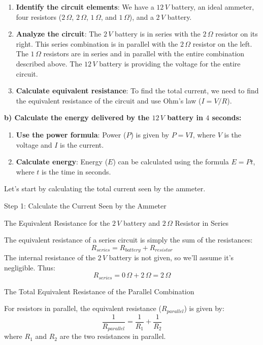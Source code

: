 \documentclass[a4paper,11pt]{article}
\begin{document}
\begin{enumerate}
  \item \textbf{Identify the circuit elements}: We have a \(12\,V\) battery, an ideal ammeter, four resistors (\(2\,\Omega\), \(2\,\Omega\), \(1\,\Omega\), and \(1\,\Omega\)), and a \(2\,V\) battery.
  \item \textbf{Analyze the circuit}: The \(2\,V\) battery is in series with the \(2\,\Omega\) resistor on its right. This series combination is in parallel with the \(2\,\Omega\) resistor on the left. The \(1\,\Omega\) resistors are in series and in parallel with the entire combination described above. The \(12\,V\) battery is providing the voltage for the entire circuit.
  \item \textbf{Calculate equivalent resistance}: To find the total current, we need to find the equivalent resistance of the circuit and use Ohm's law (\(I = V/R\)).
\end{enumerate}

\textbf{b) Calculate the energy delivered by the \(12\,V\) battery in \(4\) seconds:}

\begin{enumerate}
  \item \textbf{Use the power formula}: Power (\(P\)) is given by \(P = VI\), where \(V\) is the voltage and \(I\) is the current.
  \item \textbf{Calculate energy}: Energy (\(E\)) can be calculated using the formula \(E = Pt\), where \(t\) is the time in seconds.
\end{enumerate}

Let's start by calculating the total current seen by the ammeter.

Step 1: Calculate the Current Seen by the Ammeter

The Equivalent Resistance for the \(2\,V\) battery and \(2\,\Omega\) Resistor in Series

The equivalent resistance of a series circuit is simply the sum of the resistances:
\[ R_{series} = R_{battery} + R_{resistor} \]
The internal resistance of the \(2\,V\) battery is not given, so we'll assume it's negligible. Thus:
\[ R_{series} = 0\,\Omega + 2\,\Omega = 2\,\Omega \]

The Total Equivalent Resistance of the Parallel Combination

For resistors in parallel, the equivalent resistance (\(R_{parallel}\)) is given by:
\[ \frac{1}{R_{parallel}} = \frac{1}{R_1} + \frac{1}{R_2} \]
where \(R_1\) and \(R_2\) are the two resistances in parallel.
\end{document}
